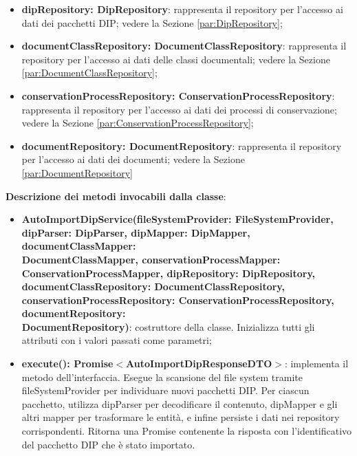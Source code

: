 \documentclass[a4paper,12pt]{article}
\begin{document}
{{{\begin{itemize}
                    \item \textbf{dipRepository: DipRepository}: rappresenta il repository per l'accesso ai dati dei pacchetti DIP; vedere la Sezione \ref{par:DipRepository};
                    \item \textbf{documentClassRepository: DocumentClassRepository}: rappresenta il repository per l'accesso ai dati delle classi documentali; vedere la Sezione \ref{par:DocumentClassRepository};
                    \item \textbf{conservationProcessRepository: ConservationProcessRepository}: rappresenta il repository per l'accesso ai dati dei processi di conservazione; vedere la Sezione \ref{par:ConservationProcessRepository};
                    \item \textbf{documentRepository: DocumentRepository}: rappresenta il repository per l'accesso ai dati dei documenti; vedere la Sezione \ref{par:DocumentRepository} 
                \end{itemize}
                
              \noindent \textbf{Descrizione dei metodi invocabili dalla classe}:
                \begin{itemize}
                    \item \textbf{AutoImportDipService(fileSystemProvider: FileSystemProvider, dipParser: DipParser, dipMapper: DipMapper, documentClassMapper:\\ DocumentClassMapper, conservationProcessMapper:\\ ConservationProcessMapper, dipRepository: DipRepository,\\ documentClassRepository: DocumentClassRepository, conservationProcessRepository: ConservationProcessRepository, documentRepository:\\ DocumentRepository)}: costruttore della classe. Inizializza tutti gli attributi con i valori passati come parametri;
                    \item \textbf{execute(): Promise$<$AutoImportDipResponseDTO$>$}: implementa il metodo dell'interfaccia. Esegue la scansione del file system tramite fileSystemProvider per individuare nuovi pacchetti DIP. Per ciascun pacchetto, utilizza dipParser per decodificare il contenuto, dipMapper e gli altri mapper per trasformare le entità, e infine persiste i dati nei repository corrispondenti. Ritorna una Promise contenente la risposta con l’identificativo del pacchetto DIP che è stato importato.
                \end{itemize}
}}}
\end{document}
